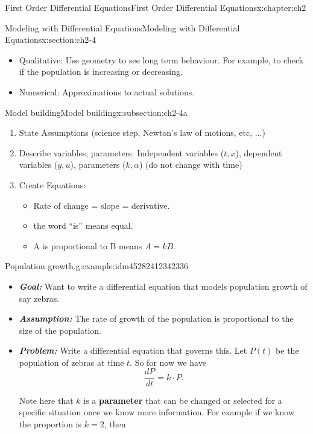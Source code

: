 \documentclass[oneside,10pt,]{book}
\newcommand{\alert}[1]{\textbf{\textit{#1}}}
\newcommand{\terminology}[1]{\textbf{#1}}
\numberwithin{equation}{section}
\numberwithin{equation}{section}
\begin{document}
\begin{chapterptx}{First Order Differential Equations}{}{First Order Differential Equations}{}{}{x:chapter:ch2}
\begin{sectionptx}{Modeling with Differential Equations}{}{Modeling with Differential Equations}{}{}{x:section:ch2-4}
\begin{introduction}{}
\begin{itemize}[label=\textbullet]
\item{}Qualitative: Use geometry to see long term behaviour. For example, to check if the population is increasing or decreasing.%
\item{}Numerical: Approximations to actual solutions.%
\end{itemize}
\end{introduction}%
%
%
\typeout{************************************************}
\typeout{************************************************}
%
\begin{subsectionptx}{Model building}{}{Model building}{}{}{x:subsection:ch2-4a}
%
\begin{enumerate}
\item{}State Assumptions (science step, Newton's law of motions, etc, ...)%
\item{}Describe variables, parameters: Independent variables (\(t,x\)), dependent variables (\(y,u\)), parameters (\(k,\alpha\)) (do not change with time)%
\item{}Create Equations:%
\begin{itemize}[label=\textbullet]
\item{}Rate of change = slope = derivative.%
\item{}the word ``is'' means equal.%
\item{}A is proportional to B means \(A=kB\).%
\end{itemize}
%
\end{enumerate}
\begin{example}{Population growth.}{g:example:idm45282412342336}%
%
\begin{itemize}[label=\textbullet]
\item{}\alert{Goal:} Want to write a differential equation that models population growth of say zebras.%
\item{}\alert{Assumption:} The rate of growth of the population is proportional to the size of the population.%
\item{}\alert{Problem:} Write a differential equation that governs this. Let \(P(t)\) be the population of zebras at time \(t\). So for now we have%
\begin{equation*}
\frac{dP}{dt}=k\cdot P.
\end{equation*}
%
\par
Note here that \(k\) is a \terminology{parameter} that can be changed or selected for a specific situation once we know more information. For example if we know the proportion is \(k=2\), then%
\begin{equation*}

\end{equation*}
\end{itemize}
\end{example}
\end{subsectionptx}
\end{sectionptx}
\end{chapterptx}
\end{document}
